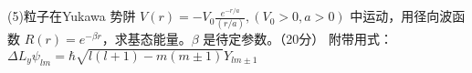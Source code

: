     (5)粒子在Yukawa 势阱 $V(r) = -V_0 \frac{e^{-r/a}}{(r/a)}, \left( V_0 > 0, a > 0 \right)$
    中运动，用径向波函数 $R(r) = e^{-\beta r}$，求基态能量。$\beta$ 是待定参数。（20分）
    附带用式：
$\Delta L_y \psi_{lm} = \hbar \sqrt{l(l+1)-m(m\pm 1)} Y_{lm \pm 1}$
\\[\\text{球坐标 } (r, \\theta, \\varphi):\\]
\\[\\nabla^2 = \\frac{1}{r^2} \\frac{\\partial}{\\partial r} \\left( r^2 \\frac{\\partial}{\\partial r} \\right) + \\frac{1}{r^2 \\sin \\theta} \\frac{\\partial}{\\partial \\theta} \\left( \\sin \\theta \\frac{\\partial}{\\partial \\theta} \\right) + \\frac{1}{r^2 \\sin^2 \\theta} \\frac{\\partial^2}{\\partial \\varphi^2}\\]



